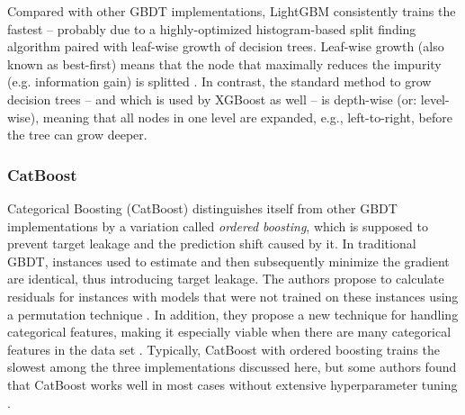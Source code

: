 Compared with other GBDT implementations, LightGBM consistently trains the fastest \parencite[1951--1954]{bentejac_comparative_2021} -- probably due to a highly-optimized histogram-based split finding algorithm paired with leaf-wise growth of decision trees. Leaf-wise growth (also known as best-first) means that the node that maximally reduces the impurity (e.g. information gain) is splitted \parencite[3]{shi_best-first_2007}. In contrast, the standard method to grow decision trees -- and which is used by XGBoost as well -- is depth-wise (or: level-wise), meaning that all nodes in one level are expanded, e.g., left-to-right, before the tree can grow deeper. 

\subsubsection{CatBoost}

Categorical Boosting (CatBoost) distinguishes itself from other GBDT implementations by a variation called \textit{ordered boosting}, which is supposed to prevent target leakage and the prediction shift caused by it. In traditional GBDT, instances used to estimate and then subsequently minimize the gradient are identical, thus introducing target leakage. The authors propose to calculate residuals for instances with models that were not trained on these instances using a permutation technique \parencites[5]{prokhorenkova_catboost_2017}[1943--1944]{bentejac_comparative_2021}. In addition, they propose a new technique for handling categorical features, making it especially viable when there are many categorical features in the data set \parencite[1]{prokhorenkova_catboost_2017}. Typically, CatBoost with ordered boosting trains the slowest among the three implementations discussed here, but some authors found that CatBoost works well in most cases without extensive hyperparameter tuning \parencite[26]{florek_benchmarking_2023}.

